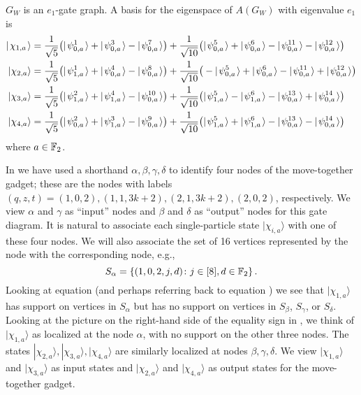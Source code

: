 \documentclass[../thesis-main/thesis-main]{subfiles}
\begin{document}
\begin{lemma}
$G_{W}$ is an $e_{1}$-gate graph. A basis for the eigenspace
of $A(G_{W})$ with eigenvalue $e_1$ is 
\begin{align}
  |\mspace{2mu} \chi_{1,a} \mspace{2mu} \rangle & =\frac{1}{\sqrt{5}}\big(|\mspace{2mu} \psi_{0,a}^{1} \mspace{2mu} \rangle + |\mspace{2mu} \psi_{0,a}^3 \mspace{2mu} \rangle - |\mspace{2mu} \psi_{0,a}^7 \mspace{2mu} \rangle\big) 
    +\frac{1}{\sqrt{10}}\big(|\mspace{2mu} \psi_{0,a}^{5} \mspace{2mu} \rangle + |\mspace{2mu} \psi_{0,a}^6 \mspace{2mu} \rangle - |\mspace{2mu} \psi_{0,a}^{11} \mspace{2mu} \rangle - |\mspace{2mu} \psi_{0,a}^{12} \mspace{2mu} \rangle\big)\label{eq:chi_alpha}\\
  |\chi_{2,a}\rangle & =\frac{1}{\sqrt{5}}\big(|\mspace{2mu} \psi_{1,a}^{1} \mspace{2mu} \rangle + |\mspace{2mu} \psi_{0,a}^4 \mspace{2mu} \rangle - |\mspace{2mu} \psi_{0,a}^8 \mspace{2mu} \rangle\big) 
    +\frac{1}{\sqrt{10}}\big(-|\mspace{2mu} \psi_{0,a}^{5} \mspace{2mu} \rangle + |\mspace{2mu} \psi_{0,a}^6 \mspace{2mu} \rangle - |\mspace{2mu} \psi_{0,a}^{11} \mspace{2mu} \rangle + |\mspace{2mu} \psi_{0,a}^{12} \mspace{2mu} \rangle\big)\label{eq:chi_beta}\\
  |\chi_{3,a}\rangle & =\frac{1}{\sqrt{5}}\big(|\mspace{2mu} \psi_{1,a}^{2} \mspace{2mu} \rangle + |\mspace{2mu} \psi_{1,a}^4 \mspace{2mu} \rangle - |\mspace{2mu} \psi_{0,a}^{10} \mspace{2mu} \rangle\big) 
    +\frac{1}{\sqrt{10}}\big(|\mspace{2mu} \psi_{1,a}^{5} \mspace{2mu} \rangle - |\mspace{2mu} \psi_{1,a}^6 \mspace{2mu} \rangle - |\mspace{2mu} \psi_{0,a}^{13} \mspace{2mu} \rangle + |\mspace{2mu} \psi_{0,a}^{14} \mspace{2mu} \rangle\big)\label{eq:chi_gamma}\\
|\chi_{4,a}\rangle & =\frac{1}{\sqrt{5}}\big(|\mspace{2mu} \psi_{0,a}^{2} \mspace{2mu} \rangle + |\mspace{2mu} \psi_{1,a}^3 \mspace{2mu} \rangle - |\mspace{2mu} \psi_{0,a}^{9} \mspace{2mu} \rangle\big) 
    +\frac{1}{\sqrt{10}}\big(|\mspace{2mu} \psi_{1,a}^{5} \mspace{2mu} \rangle + |\mspace{2mu} \psi_{1,a}^6 \mspace{2mu} \rangle - |\mspace{2mu} \psi_{0,a}^{13} \mspace{2mu} \rangle - |\mspace{2mu} \psi_{0,a}^{14} \mspace{2mu} \rangle\big)\label{eq:chi_delta}
\end{align}
where $a\in\mathbb{F}_2$. 
\label{lem:w_gate_single_particle_basis}
\end{lemma}

In  we have used a shorthand $\alpha,\beta,\gamma,\delta$ to identify four nodes of the move-together gadget; these are the nodes with labels $(q,z,t)=(1,0,2),(1,1,3k+2),(2,1,3k+2),(2,0,2)$, respectively. We view $\alpha$ and $\gamma$ as ``input'' nodes and $\beta$ and $\delta$ as ``output'' nodes for this gate diagram. It is natural to associate each single-particle state $|\chi_{i,a}\rangle$ with one of these four nodes.  We will also associate the set of 16 vertices represented by the node with the corresponding node, e.g.,
\begin{equation}
  S_{\alpha}=\left\{ (1,0,2,j,d)\colon j\in[8], d\in \mathbb{F}_2\right\} .
\end{equation}
Looking at equation  (and perhaps referring back to equation ) we see that $|\chi_{1,a}\rangle$ has support on vertices in $S_{\alpha}$ but has no support on vertices in $S_{\beta}$, $S_{\gamma}$, or $S_{\delta}$. Looking at the picture on the right-hand side of the equality sign in , we think of $|\chi_{1,a}\rangle$ as localized at the node $\alpha$, with no support on the other three nodes. The states $|\chi_{2,a}\rangle,|\chi_{3,a}\rangle,|\chi_{4,a}\rangle$ are similarly localized at nodes $\beta,\gamma,\delta$. We view $|\chi_{1,a}\rangle$ and $|\chi_{3,a}\rangle$ as input states and $|\chi_{2,a}\rangle$ and $|\chi_{4,a}\rangle$ as output states for the move-together gadget.
\end{document}
